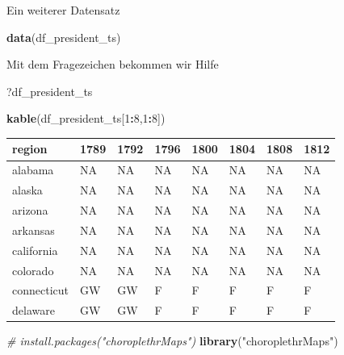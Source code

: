\documentclass[ignorenonframetext,]{beamer}
\newenvironment{Shaded}{\begin{snugshade}}{\end{snugshade}}
\newcommand{\CommentTok}[1]{\textcolor[rgb]{0.56,0.35,0.01}{\textit{#1}}}
\newcommand{\DecValTok}[1]{\textcolor[rgb]{0.00,0.00,0.81}{#1}}
\newcommand{\KeywordTok}[1]{\textcolor[rgb]{0.13,0.29,0.53}{\textbf{#1}}}
\newcommand{\NormalTok}[1]{#1}
\newcommand{\OperatorTok}[1]{\textcolor[rgb]{0.81,0.36,0.00}{\textbf{#1}}}
\newcommand{\StringTok}[1]{\textcolor[rgb]{0.31,0.60,0.02}{#1}}
\begin{document}
\begin{frame}[fragile]{Ein weiterer Datensatz}
\protect\hypertarget{ein-weiterer-datensatz}{}

\begin{Shaded}
\begin{Highlighting}[]
\KeywordTok{data}\NormalTok{(df_president_ts)}
\end{Highlighting}
\end{Shaded}

Mit dem Fragezeichen bekommen wir Hilfe

\begin{Shaded}
\begin{Highlighting}[]
\NormalTok{?df_president_ts}
\end{Highlighting}
\end{Shaded}

\begin{Shaded}
\begin{Highlighting}[]
\KeywordTok{kable}\NormalTok{(df_president_ts[}\DecValTok{1}\OperatorTok{:}\DecValTok{8}\NormalTok{,}\DecValTok{1}\OperatorTok{:}\DecValTok{8}\NormalTok{])}
\end{Highlighting}
\end{Shaded}

\begin{longtable}[]{@{}llllllll@{}}
\toprule
region & 1789 & 1792 & 1796 & 1800 & 1804 & 1808 & 1812\tabularnewline
\midrule
\endhead
alabama & NA & NA & NA & NA & NA & NA & NA\tabularnewline
alaska & NA & NA & NA & NA & NA & NA & NA\tabularnewline
arizona & NA & NA & NA & NA & NA & NA & NA\tabularnewline
arkansas & NA & NA & NA & NA & NA & NA & NA\tabularnewline
california & NA & NA & NA & NA & NA & NA & NA\tabularnewline
colorado & NA & NA & NA & NA & NA & NA & NA\tabularnewline
connecticut & GW & GW & F & F & F & F & F\tabularnewline
delaware & GW & GW & F & F & F & F & F\tabularnewline
\bottomrule
\end{longtable}

\begin{Shaded}
\begin{Highlighting}[]
\CommentTok{# install.packages("choroplethrMaps")}
\KeywordTok{library}\NormalTok{(}\StringTok{"choroplethrMaps"}\NormalTok{)}
\end{Highlighting}
\end{Shaded}

\end{frame}
\end{document}
